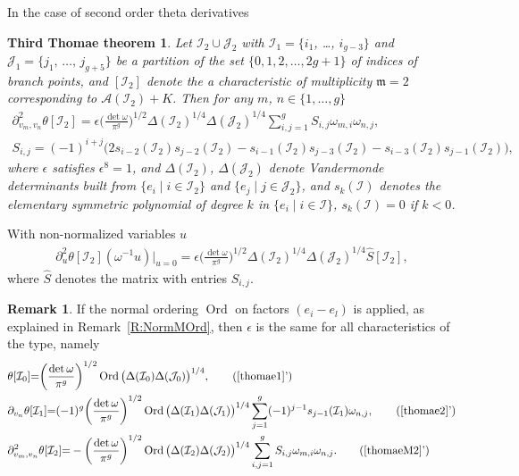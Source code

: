 \documentclass[twoside]{amsart}
\newcommand{\I}{\mathcal{I}}
\newcommand{\J}{\mathcal{J}}
\newcommand{\mFr}{\mathfrak{m}}
\DeclareMathOperator{\Ord}{Ord}
\theoremstyle{definition}
\newtheorem{rem}{Remark}[section]
\theoremstyle{plain}
\begin{document}
In the case of second order theta derivatives
\newtheorem*{GTteo}{Third Thomae theorem}
\begin{GTteo}
Let $\I_2\cup \J_2$ with $\I_1=\{i_1$, \ldots, $i_{g-3}\}$ and $\J_1 = \{j_1,\,\dots,\,j_{g+5}\}$ 
 be a partition of the set $\{0,1,2,\dots,2g+1\}$ of indices of branch points, and
 $[\I_2]$ denote the a characteristic of multiplicity $\mFr=2$ 
 corresponding to $\mathcal{A} (\I_2) + K$. Then for any $m$, $n \in \{1, \dots, g\}$
 \begin{gather}\label{thomaeM2}
 \partial^2_{v_m, v_n} \theta[\I_2] 
 = \epsilon \bigg(\frac{\det \omega}{\pi^g}\bigg)^{1/2} \Delta(\I_2)^{1/4} \Delta(\J_2)^{1/4} 
 \sum_{i,j=1}^g S_{i,j} \omega_{m,i} \omega_{n,j},\\
 S_{i,j} = (-1)^{i+j} \big(2 s_{i-2}(\I_2) s_{j-2}(\I_2) - s_{i-1}(\I_2) s_{j-3}(\I_2) - s_{i-3}(\I_2) s_{j-1}(\I_2) \big),
 \label{Smatr}
\end{gather}
where  $\epsilon$ satisfies $\epsilon^8=1$, and $\Delta(\I_2)$, $\Delta(\J_2)$ denote
Vandermonde determinants built from $\{e_i\mid i\in \I_2\}$ and $\{e_j\mid j\in \J_2\}$,
and $s_{k}(\I)$ denotes the elementary symmetric polynomial of degree $k$ in $\{e_i\mid i\in \I\}$,
$s_{k}(\I)=0$ if $k<0$.
\end{GTteo}

With non-normalized variables $u$
 \begin{gather}\label{thomae3MFu}
 \partial_{u}^2  \theta[\I_2](\omega^{-1} u) \big|_{u=0} 
 = \epsilon \bigg(\frac{\det \omega}{\pi^g}\bigg)^{1/2} \Delta(\I_2)^{1/4} \Delta(\J_2)^{1/4} \hat{S}[\I_2],
\end{gather}
where $\hat{S}$ denotes the matrix with entries $S_{i,j}$.

\begin{rem}\label{R:NormThomaeF}
If the normal ordering $\Ord$ on factors $(e_i-e_l)$ is applied, as explained in Remark~\ref{R:NormMOrd}, 
then $\epsilon$ is the same for all characteristics of the type,
namely
 \begin{align}
& \theta[\I_0] {=}  \bigg(\frac{\det \omega}{\pi^g}\bigg)^{1/2} 
 \Ord \big(\Delta(\I_0) \Delta(\J_0) \big)^{1/4},  \tag{\ref{thomae1}'}\label{thomae1Ord} \\
& \partial_{v_n} \theta[\I_1]
 {=} (-1)^g \bigg(\frac{\det \omega}{\pi^g}\bigg)^{1/2} \Ord \big(\Delta(\I_1) \Delta(\J_1)\big)^{1/4} 
 \sum_{j=1}^g  (-1)^{j-1} s_{j-1}(\I_1) \omega_{n,j},  \tag{\ref{thomae2}'}\label{thomae2Ord} \\
& \partial^2_{v_m, v_n} \theta[\I_2] 
 {=} - \bigg(\frac{\det \omega}{\pi^g}\bigg)^{1/2} \Ord \big(\Delta(\I_2) \Delta(\J_2)\big)^{1/4} 
 \sum_{i,j=1}^g S_{i,j}   \omega_{m,i} \omega_{n,j}.
\tag{\ref{thomaeM2}'}\label{thomaeM2Ord} 
\end{align}
\end{rem}
\end{document}

